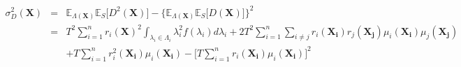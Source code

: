 \documentclass[preprint,12pt]{elsarticle}
\begin{document}
\begin{eqnarray}
\sigma^{2}_{D}(\boldsymbol{X})&=&\mathbb{E}_{\Lambda(\boldsymbol{X})}\mathbb{E}_{S} \bigg[D^{2}(\boldsymbol{X}) \bigg]- \bigg\{\mathbb{E}_{\Lambda(\boldsymbol{X})}\mathbb{E}_{S}\bigg[D(\boldsymbol{X}) \bigg] \bigg\}^{2} \nonumber\\
&=&T^{2}\sum_{i=1}^{n}r_{i}(\boldsymbol{X})^{2}\int_{\lambda_{i}\in\Lambda_{i}}{\lambda_{i}^{2}f(\lambda_{i})d\lambda_{i}}+2T^{2}\sum_{i=1}^{n}\sum_{i\ne j}{r_{i}(\boldsymbol{X_{i}})r_{j}(\boldsymbol{X_{j}})\mu_{i}(\boldsymbol{X_{i}})\mu_{j}(\boldsymbol{X_{j}})} \nonumber\\
&&+T\sum_{i=1}^{n}{r_{i}^{2}(\boldsymbol{X_{i}})\mu_{i}(\boldsymbol{X_{i}})}-\bigg[T\sum_{i=1}^{n}{r_{i}(\boldsymbol{X_i})\mu_{i}(\boldsymbol{X_i})}\bigg]^{2}
\end{eqnarray}
\end{document}
